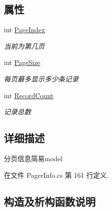\subsection*{属性}
\begin{DoxyCompactItemize}
\item 
int \hyperlink{class_x_c_l_net_tools_1_1_entity_1_1_pager_info_simple_a92e66733aad9fb09cec9df1fdb39beb2}{Page\+Index}
\begin{DoxyCompactList}\small\item\em 当前为第几页 \end{DoxyCompactList}\item 
int \hyperlink{class_x_c_l_net_tools_1_1_entity_1_1_pager_info_simple_a3a8883f09f14d322edc5e8be13f75cb6}{Page\+Size}
\begin{DoxyCompactList}\small\item\em 每页最多显示多少条记录 \end{DoxyCompactList}\item 
int \hyperlink{class_x_c_l_net_tools_1_1_entity_1_1_pager_info_simple_abe1bab597cad994b4515208cbb77f0bf}{Record\+Count}
\begin{DoxyCompactList}\small\item\em 记录总数 \end{DoxyCompactList}\end{DoxyCompactItemize}


\subsection{详细描述}
分页信息简易model 



在文件 Pager\+Info.\+cs 第 161 行定义.



\subsection{构造及析构函数说明}
